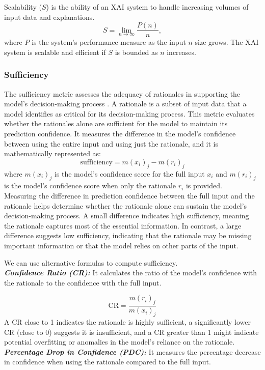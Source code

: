 \documentclass[final,5p,times,twocolumn]{elsarticle}
\begin{document}
Scalability ($S$) is the ability of an XAI system to handle increasing volumes of input data and explanations.
\begin{equation}
S = \lim_{n \to \infty} \frac{P(n)}{n},
\end{equation}
where $P$ is the system's performance measure as the input $n$ size grows. The XAI system is scalable and efficient if $S$ is bounded as $n$ increases.

\subsubsection{Sufficiency}
The sufficiency metric assesses the adequacy of rationales in supporting the model's decision-making process \cite{deyoung2019eraser}. A rationale is a subset of input data that a model identifies as critical for its decision-making process. This metric evaluates whether the rationales alone are sufficient for the model to maintain its prediction confidence. It measures the difference in the model’s confidence between using the entire input and using just the rationale, and it is mathematically represented as:
\begin{equation}
\text{sufficiency} = m(x_i)_j - m(r_i)_j
\end{equation}
where $m(x_i)_j$ is the model's confidence score for the full input $x_i$ and  $m(r_i)_j$ is the model's confidence score when only the rationale $r_i$ is provided.\\
Measuring the difference in prediction confidence between the full input and the rationale helps determine whether the rationale alone can sustain the model’s decision-making process. A small difference indicates high sufficiency, meaning the rationale captures most of the essential information. In contrast, a large difference suggests low sufficiency, indicating that the rationale may be missing important information or that the model relies on other parts of the input.

We can use alternative formulas to compute sufficiency.\\
\textbf{ \textit {Confidence Ratio (CR):}} It calculates the ratio of the model's confidence with the rationale to the confidence with the full input.

\begin{equation}
\text{CR} = \frac{m(r_i)_j}{m(x_i)_j}
\end{equation}
A CR close to 1 indicates the rationale is highly sufficient, a significantly lower CR (close to 0) suggests it is insufficient, and a CR greater than 1 might indicate potential overfitting or anomalies in the model's reliance on the rationale.\\
\textbf{ \textit {Percentage Drop in Confidence (PDC):}}  It
 measures the percentage decrease in confidence when using the rationale compared to the full input.
\end{document}
